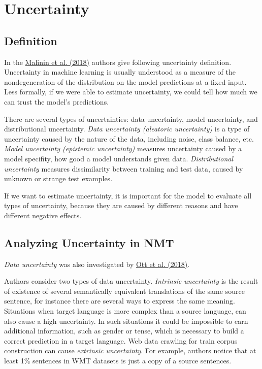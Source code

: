 \documentclass[a4paper,14pt]{extarticle}
\newcommand{\bibref}[3]{\hyperlink{#1}{#2 (#3)}}
\begin{document}
	\section{Uncertainty}
	\subsection{Definition}
	In the \bibref{prior}{Malinin et al.}{2018} authors give following uncertainty definition. Uncertainty in machine learning is usually understood as a measure of the nondegeneration of the distribution on the model predictions at a fixed input. Less formally, if we were able to estimate uncertainty, we could tell how much we can trust the model's predictions.
	
	There are several types of uncertainties: data uncertainty, model uncertainty, and distributional uncertainty. \textit{Data uncertainty (aleatoric uncertainty)} is a type of uncertainty caused by the nature of the data, including noise, class balance, etc. \textit{Model uncertainty (epistemic uncertainty)}  measures uncertainty caused by a model specifity, how good a model understands given data. \textit{Distributional uncertainty} measures dissimilarity between training and test data, caused by unknown or strange test examples. 
	
	If we want to estimate uncertainty, it is important for the model to evaluate all types of uncertainty, because they are caused by different reasons and have different negative effects.
	
	\subsection{Analyzing Uncertainty in NMT}
	\textit{Data uncertainty} was also investigated by \bibref{anal_uncertainty}{Ott et al.}{2018}.
	
	Authors consider two types of data uncertainty. \textit{Intrinsic uncertainty} is the result of existence of several semantically equivalent translations of the same source sentence, for instance there are several ways to express the same meaning. Situations when target language is more complex than a source language, can also cause a high uncertainty. In such situations it could be impossible to earn additional information, such as gender or tense, which is necessary to build a correct prediction in a target language. Web data crawling for train corpus construction can cause \textit{extrinsic uncertainty}. For example, authors notice that at least 1\% sentences in WMT datasets is just a copy of a source sentences.
	
\end{document}

